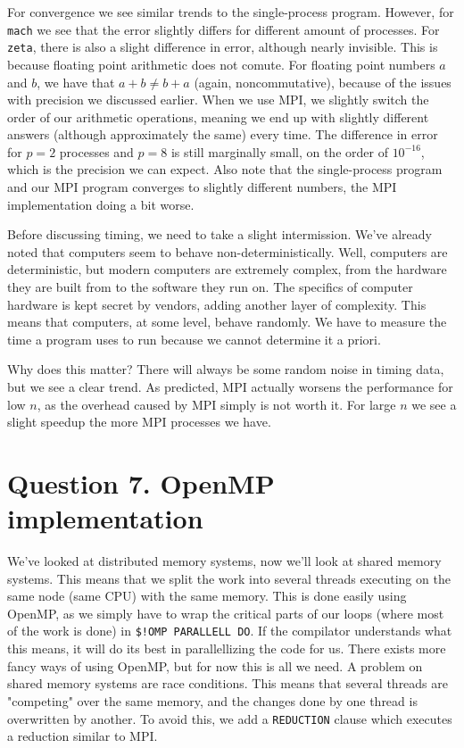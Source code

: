 \documentclass[12pt]{article}
\begin{document}
For convergence we see similar trends to the single-process program. However, for \texttt{mach} we see that the error slightly differs for different amount of processes.
For \texttt{zeta}, there is also a slight difference in error, although nearly invisible. This is because floating point arithmetic does not comute. 
For floating point numbers $a$ and $b$, we have that $a + b \neq b + a$ (again, noncommutative),
because of the issues with precision we discussed earlier. When we use MPI, we slightly switch the order
of our arithmetic operations, meaning we end up with slightly different answers (although approximately the same) every time. The difference in error for $p=2$ processes and $p=8$ is still
marginally small, on the order of $10^{-16}$, which is the precision we can expect. Also note that the single-process program and our MPI program converges to slightly different numbers, the MPI 
implementation doing a bit worse.

Before discussing timing, we need to take a slight intermission. We've already noted that computers seem to behave non-deterministically. Well, computers are deterministic,
but modern computers are extremely complex, from the hardware they are built from to the software they run on. The specifics of computer hardware is kept secret by vendors, 
adding another layer of complexity. This means that computers, at some level, behave randomly. We have to measure the time a program uses to run because we cannot determine it a priori.

Why does this matter? There will always be some random noise in timing data, but we see a clear trend. As predicted, MPI actually worsens the performance for low $n$, as the overhead
caused by MPI simply is not worth it. For large $n$ we see a slight speedup the more MPI processes we have.

\section{Question 7. OpenMP implementation}
We've looked at distributed memory systems, now we'll look at shared memory systems. This means that we split the work into several threads executing on the same node (same CPU) with the same memory.
This is done easily using OpenMP, as we simply have to wrap the critical parts of our loops (where most of the work is done) in \texttt{\$!OMP PARALLELL DO}. If the compilator understands what
this means, it will do its best in parallellizing the code for us. There exists more fancy ways of using OpenMP, but for now this is all we need. A problem on shared memory systems are race 
conditions.
This means that several threads are "competing" over the same memory, and the changes done by one thread is overwritten by another. To avoid this, we add a \texttt{REDUCTION} clause which
executes a reduction similar to MPI.
\end{document}
